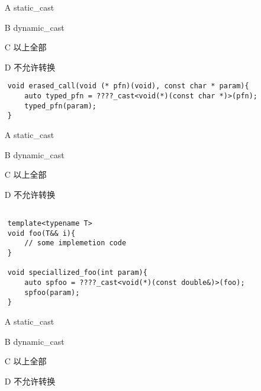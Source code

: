 \documentclass[11pt,fancyhdr]{ctexart}
\begin{document}
\begin{itemize}
    \item [A]
          static\_cast
    \item [B]
          dynamic\_cast
    \item [C]
          以上全部
    \item [D]
          不允许转换
\end{itemize}

\begin{verbatim}
    void erased_call(void (* pfn)(void), const char * param){
        auto typed_pfn = ????_cast<void(*)(const char *)>(pfn);
        typed_pfn(param);
    }
\end{verbatim}

\begin{itemize}
    \item [A]
          static\_cast
    \item [B]
          dynamic\_cast
    \item [C]
          以上全部
    \item [D]
          不允许转换
\end{itemize}

\begin{verbatim}

    template<typename T>
    void foo(T&& i){
        // some implemetion code
    }
    
    void speciallized_foo(int param){
        auto spfoo = ????_cast<void(*)(const double&)>(foo);
        spfoo(param);
    }
\end{verbatim}

\begin{itemize}
    \item [A]
          static\_cast
    \item [B]
          dynamic\_cast
    \item [C]
          以上全部
    \item [D]
          不允许转换
\end{itemize}
\end{document}
